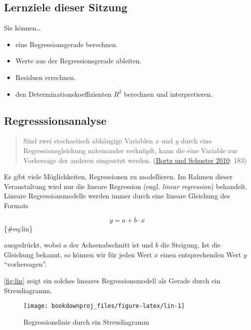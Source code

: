 \documentclass[
  ngerman,
]{article}
\providecommand{\tightlist}{%
  \setlength{\itemsep}{0pt}\setlength{\parskip}{0pt}}
\begin{document}
\hypertarget{lernziele-dieser-sitzung-7}{%
\subsection{Lernziele dieser Sitzung}\label{lernziele-dieser-sitzung-7}}

Sie können\ldots{}

\begin{itemize}
\tightlist
\item
  eine Regressionsgerade berechnen.
\item
  Werte aus der Regressionsgerade ableiten.
\item
  Residuen errechnen.
\item
  den Determinationskoeffizienten \(R^2\) berechnen und interpretieren.
\end{itemize}

\hypertarget{regresssionsanalyse}{%
\subsection{Regresssionsanalyse}\label{regresssionsanalyse}}

\begin{quote}
Sind zwei stochastisch abhängige Variablen \(x\) und \(y\) durch eine Regressionsgleichung miteinander verknüpft, kann die eine Variable zur Vorhersage der anderen eingesetzt werden. (\protect\hyperlink{ref-bortz}{Bortz und Schuster 2010}: 183)
\end{quote}

Es gibt viele Möglichkeiten, Regressionen zu modellieren. Im Rahmen dieser Veranstaltung wird nur die lineare Regression (engl. \emph{linear regression}) behandelt. Lineare Regressionsmodelle werden immer durch eine lineare Gleichung des Formats

\[
y=a+b\cdot x
\]\{\#eq:lin\}

ausgedrückt, wobei \(a\) der Achsenabschnitt ist und \(b\) die Steigung. Ist die Gleichung bekannt, so können wir für jeden Wert \(x\) einen entsprechenden Wert \(y\) ``vorhersagen''.

\autoref{fig:lin} zeigt ein solches lineares Regressionsmodell als Gerade durch ein Streudiagramm.

\begin{figure}[h]

{\centering \texttt{[image: bookdownproj\_files/figure-latex/lin-1]} 

}

\caption{Regressionslinie durch ein Streudiagramm}\label{fig:lin}
\end{figure}
\end{document}
